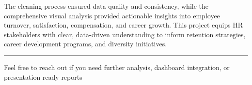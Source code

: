 \documentclass[
  letterpaper,
  DIV=11,
  numbers=noendperiod]{scrartcl}
\begin{document}
The cleaning process ensured data quality and consistency, while the
comprehensive visual analysis provided actionable insights into employee
turnover, satisfaction, compensation, and career growth. This project
equips HR stakeholders with clear, data-driven understanding to inform
retention strategies, career development programs, and diversity
initiatives.

\begin{center}\rule{0.5\linewidth}{0.5pt}\end{center}

Feel free to reach out if you need further analysis, dashboard
integration, or presentation-ready reports
\end{document}
